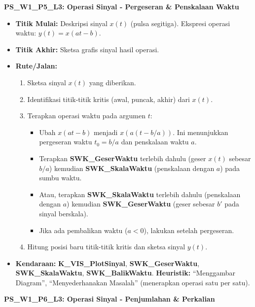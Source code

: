 \documentclass[
  letterpaper,
  DIV=11,
  numbers=noendperiod]{scrreprt}
\providecommand{\tightlist}{%
  \setlength{\itemsep}{0pt}\setlength{\parskip}{0pt}}
\begin{document}
\textbf{PS\_W1\_P5\_L3: Operasi Sinyal - Pergeseran \& Penskalaan Waktu}

\begin{itemize}
\tightlist
\item
  \textbf{Titik Mulai:} Deskripsi sinyal \(x(t)\) (pulsa segitiga).
  Ekspresi operasi waktu: \(y(t) = x(at-b)\).
\item
  \textbf{Titik Akhir:} Sketsa grafis sinyal hasil operasi.
\item
  \textbf{Rute/Jalan:}

  \begin{enumerate}
  \def\labelenumi{\arabic{enumi}.}
  \tightlist
  \item
    Sketsa sinyal \(x(t)\) yang diberikan.
  \item
    Identifikasi titik-titik kritis (awal, puncak, akhir) dari \(x(t)\).
  \item
    Terapkan operasi waktu pada argumen \(t\):

    \begin{itemize}
    \tightlist
    \item
      Ubah \(x(at-b)\) menjadi \(x(a(t-b/a))\). Ini menunjukkan
      pergeseran waktu \(t_0 = b/a\) dan penskalaan waktu \(a\).
    \item
      Terapkan \textbf{SWK\_GeserWaktu} terlebih dahulu (geser \(x(t)\)
      sebesar \(b/a\)) kemudian \textbf{SWK\_SkalaWaktu} (penskalaan
      dengan \(a\)) pada sumbu waktu.
    \item
      Atau, terapkan \textbf{SWK\_SkalaWaktu} terlebih dahulu
      (penskalaan dengan \(a\)) kemudian \textbf{SWK\_GeserWaktu} (geser
      sebesar \(b'\) pada sinyal berskala).
    \item
      Jika ada pembalikan waktu (\(a<0\)), lakukan setelah pergeseran.
    \end{itemize}
  \item
    Hitung posisi baru titik-titik kritis dan sketsa sinyal \(y(t)\).
  \end{enumerate}
\item
  \textbf{Kendaraan:} \textbf{K\_VIS\_PlotSinyal},
  \textbf{SWK\_GeserWaktu}, \textbf{SWK\_SkalaWaktu},
  \textbf{SWK\_BalikWaktu}. \textbf{Heuristik:} ``Menggambar Diagram'',
  ``Menyederhanakan Masalah'' (menerapkan operasi satu per satu).
\end{itemize}

\textbf{PS\_W1\_P6\_L3: Operasi Sinyal - Penjumlahan \& Perkalian}
\end{document}
